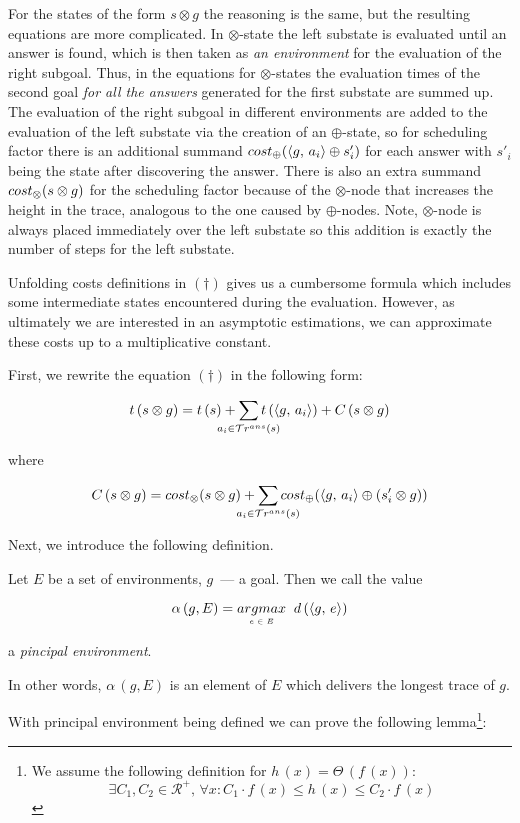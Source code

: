 For the states of the form $s \otimes g$ the reasoning is the same, but the resulting equations are more complicated.
In $\otimes$-state the left substate is evaluated until an answer is found, which is then taken as
\emph{an environment} for the evaluation of the right subgoal.
Thus, in the equations for $\otimes$-states the evaluation times of the second goal \emph{for all
the answers} generated for the first substate are summed up. The evaluation of the right subgoal
in different environments are added to the evaluation of the left substate via the creation of
an $\oplus$-state, so for scheduling factor there is
an additional summand $cost_{\oplus}(\langle g ,\, a_i \rangle \oplus s'_i)$ for each answer with $s'_i$ being the state
after discovering the answer.
There is also an extra summand $cost_{\otimes}(s \otimes g)$ for the scheduling factor because of the
$\otimes$-node that increases the height in the trace, analogous to the one caused by
$\oplus$-nodes.
Note, $\otimes$-node is always placed immediately over the left substate so this
addition is exactly the number of steps for the left substate.

Unfolding costs definitions in $(\dagger)$ gives us a cumbersome formula which 
includes some intermediate states encountered during the evaluation. However, as ultimately
we are interested in an asymptotic estimations, we can approximate these costs up to a multiplicative constant.

First, we rewrite the equation $(\dagger)$ in the following form:

\[ t\,(s \otimes g)  =  t\,(s) + \smashoperator[lr]{\sum\limits_{a_i \in \tra{s}}} t\,(\taskst{g}{a_i}) + C\,(s \otimes g) \]

where

\[ C\,(s \otimes g) = \costconj{s}{g} + \smashoperator[lr]{\sum\limits_{a_i \in \tra{s}}} \costdisj{\taskst{g}{a_i}}{(s'_i \otimes g)} \]

Next, we introduce the following definition.

\begin{definition}
Let $E$ be a set of environments, $g$~--- a goal. Then we call the value

\[
\alpha\,(g, E) = \argmax{e \in E} d\,(\taskst{g}{e})
\]

a \emph{pincipal environment}.
\end{definition}

In other words, $\alpha\,(g, E)$ is an element of $E$ which delivers the longest trace of $g$.

With principal environment being defined we can prove the following lemma\footnote{We assume the following definition for 
$h\,(x) = \Theta\,(f\,(x))$: \[\exists C_1, C_2 \in \mathcal{R^{+}}, \, \forall x : C_1 \cdot f\,(x) \le h\,(x) \le C_2 \cdot f\,(x) \]}:

